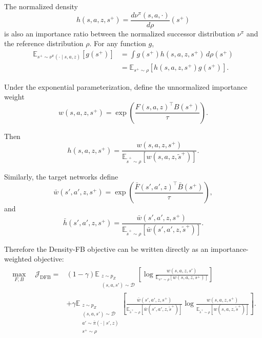 \documentclass[11pt]{article}
\begin{document}
The normalized density
\begin{equation}
    h(s,a,z,s^+) = \frac{d\nu^\pi(s,a,\cdot)}{d\rho}(s^+)
\end{equation}
is also an importance ratio between the normalized successor distribution $\nu^\pi$ and the reference distribution $\rho$.
For any function $g$,
\begin{align}
    \mathbb E_{s^+\sim\nu^\pi(\cdot\mid s,a,z)} \left[g(s^+)\right] &= \int g(s^+) h(s,a,z,s^+) \, d\rho(s^+) \\
                                                                    &= \mathbb E_{s^+\sim\rho} \left[ h(s,a,z,s^+)g(s^+) \right].
\end{align}

Under the exponential parameterization, define the unnormalized importance weight
\begin{equation}
    w(s,a,z,s^+) = \exp\left( \frac{F(s,a,z)^\top B(s^+)}{\tau} \right).
    \label{eq:importance-weight}
\end{equation}

Then
\begin{equation}
    \boxed{
    h(s,a,z,s^+) = \frac{w(s,a,z,s^+)}{ \mathbb E_{\tilde s^+\sim\rho} [w(s,a,z,\tilde s^+)] }. 
    }
    \label{eq:importance-ratio}
\end{equation}

Similarly, the target networks define
\begin{equation}
    \bar w(s',a',z,s^+) = \exp\left( \frac{ \bar F(s',a',z)^\top\bar B(s^+)}{\tau}\right),
\end{equation}
and
\begin{equation}
    \boxed{
    \bar h(s',a',z,s^+) = \frac{ \bar w(s',a',z,s^+)}{\mathbb E_{\tilde s^+\sim\rho}[\bar w(s',a',z,\tilde s^+)]}.
    }
    \label{eq:target-importance-ratio}
\end{equation}

Therefore the Density-FB objective can be written directly as an importance-weighted objective:
\begin{align}
\boxed{
\begin{aligned}
    \max_{F,B}\quad \mathcal J_{\mathrm{DFB}} ={}& (1-\gamma) \mathbb E_{\substack{z\sim p_Z\\ (s,a,s')\sim\mathcal D}} 
                                                    \left[ \log \frac{w(s,a,z,s')}{\mathbb E_{s^+\sim\rho}[w(s,a,z,s^+)]}\right] \\
                                                &+ \gamma \mathbb E_{\substack{z\sim p_Z\\(s,a,s')\sim\mathcal D\\a'\sim\bar\pi(\cdot\mid s',z)\\s^+\sim\rho}} \left[ \frac{\bar w(s',a',z,s^+)}{\mathbb E_{\tilde s^+\sim\rho}[\bar w(s',a',z,\tilde s^+)]} \log\frac{w(s,a,z,s^+)}{\mathbb E_{\tilde s^+\sim\rho}[w(s,a,z,\tilde s^+)]}\right].
\end{aligned}
}
\label{eq:dfb-importance-population}
\end{align}
\end{document}
